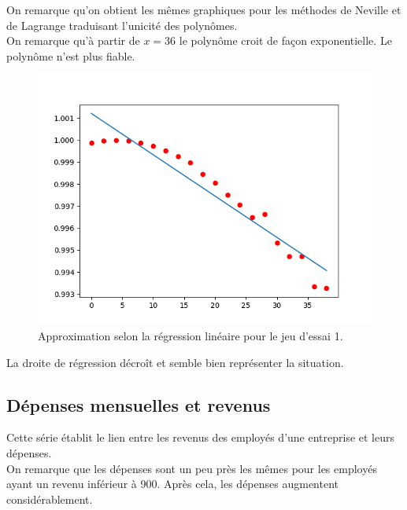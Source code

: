 \documentclass[12pt,french,titlepage]{article}
\begin{document}
		On remarque qu'on obtient les mêmes graphiques pour les méthodes de Neville et de Lagrange traduisant l'unicité des polynômes.\\
		On remarque qu'à partir de $x=36$ le polynôme croit de façon exponentielle. Le polynôme n'est plus fiable.\\
		
		
		\begin{figure}[H]
		\includegraphics[width=\textwidth]{"13.png"}
		\caption{Approximation selon la régression linéaire pour le jeu d'essai 1.}
		\end{figure}
	
		La droite de régression décroît et semble bien représenter la situation.\\
		
		

	\subsection{Dépenses mensuelles et revenus}
	\label{dr}
		Cette série établit le lien entre les revenus des employés d'une entreprise et leurs dépenses.\\
		On remarque que les dépenses sont un peu près les mêmes pour les employés ayant un revenu inférieur à 900. Après cela, les dépenses augmentent considérablement.
		
\end{document}

